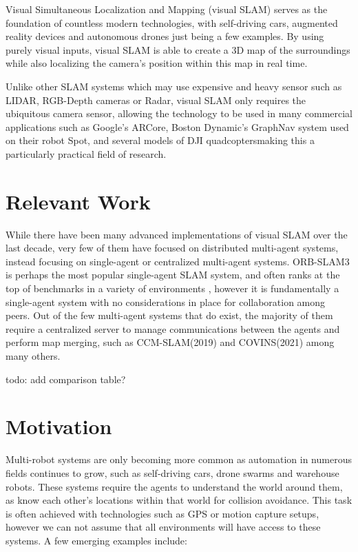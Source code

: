 
\label{sec:1}
Visual Simultaneous Localization and Mapping (visual SLAM) serves as the foundation of countless modern technologies, with self-driving cars, augmented reality devices and autonomous drones just being a few examples. By using purely visual inputs, visual SLAM is able to create a 3D map of the surroundings while also localizing the camera's position within this map in real time.

Unlike other SLAM systems which may use expensive and heavy sensor such as LIDAR, RGB-Depth cameras or Radar, visual SLAM only requires the ubiquitous camera sensor, allowing the technology to be used in many commercial applications such as Google's ARCore\footnotemark[1], Boston Dynamic's GraphNav system used on their robot Spot\footnotemark[2], and several models of DJI quadcopters\footnotemark[3] making this a particularly practical field of research.


\section{Relevant Work}
\label{sec:1.1}
While there have been many advanced implementations of visual SLAM over the last decade, very few of them have focused on distributed multi-agent systems, instead focusing on single-agent or centralized multi-agent systems. ORB-SLAM3 \autocite{ORBSLAM3_TRO} is perhaps the most popular single-agent SLAM system, and often ranks at the top of benchmarks in a variety of environments \autocite{DBLP:journals/corr/abs-2108-01654}, however it is fundamentally a single-agent system with no considerations in place for collaboration among peers. Out of the few multi-agent systems that do exist, the majority of them require a centralized server to manage communications between the agents and perform map merging, such as CCM-SLAM(2019) \autocite{schmuck2019ccm} and COVINS(2021) \autocite{schmuck2021covins} among many others.

todo: add comparison table?

\section{Motivation}
\label{sec:1.2}
Multi-robot systems are only becoming more common as automation in numerous fields continues to grow, such as self-driving cars, drone swarms and warehouse robots. These systems require the agents to understand the world around them, as know each other's locations within that world for collision avoidance. This task is often achieved with technologies such as GPS or motion capture setups, however we can not assume that all environments will have access to these systems. A few emerging examples include: \noparskip
\smallbreak

